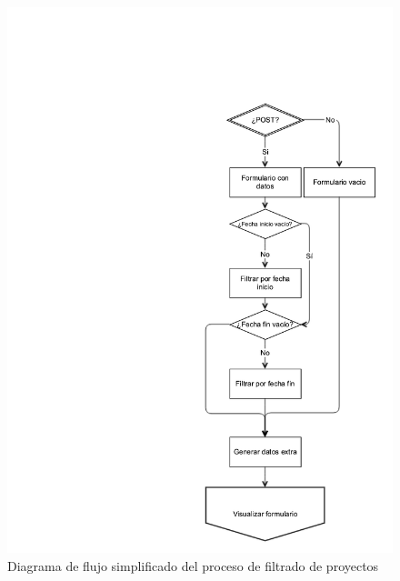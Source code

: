 \begin{figure}[!htbp]
	\centering
	\includegraphics[scale=0.6]{fig/flow}
	\caption{Diagrama de flujo simplificado del proceso de filtrado de proyectos}
	\label{fig:project_flow_diagram}
\end{figure}
